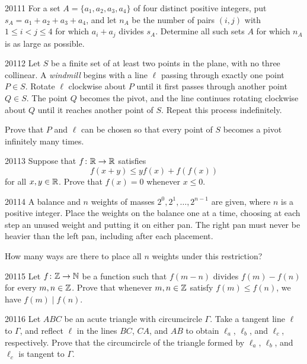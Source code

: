 
\begin{problem}{2011}{1}
For a set $A=\{a_1, a_2, a_3, a_4\}$ of four distinct positive integers, put $s_A=a_1+a_2+a_3+a_4$, and let $n_A$ be the number of pairs $(i, j)$ with $1\leq i<j\leq4$ for which $a_i+a_j$ divides $s_A$. Determine all such sets $A$ for which $n_A$ is as large as possible.
\end{problem}

\begin{problem}{2011}{2}
Let $S$ be a finite set of at least two points in the plane, with no three collinear. A \emph{windmill} begins with a line $\ell$ passing through exactly one point $P\in S$. Rotate $\ell$ clockwise about $P$ until it first passes through another point $Q\in S$. The point $Q$ becomes the pivot, and the line continues rotating clockwise about $Q$ until it reaches another point of $S$. Repeat this process indefinitely.

Prove that $P$ and $\ell$ can be chosen so that every point of $S$ becomes a pivot infinitely many times.
\end{problem}

\begin{problem}{2011}{3}
Suppose that $f\colon\mathbb{R}\to\mathbb{R}$ satisfies
\[
    f(x+y)\leq yf(x)+f(f(x))
\]
for all $x, y\in\mathbb{R}$. Prove that $f(x)=0$ whenever $x\leq0$.
\end{problem}

\begin{problem}{2011}{4}
A balance and $n$ weights of masses $2^0, 2^1, \dots, 2^{n-1}$ are given, where $n$ is a positive integer. Place the weights on the balance one at a time, choosing at each step an unused weight and putting it on either pan. The right pan must never be heavier than the left pan, including after each placement.

How many ways are there to place all $n$ weights under this restriction?
\end{problem}

\begin{problem}{2011}{5}
Let $f\colon\mathbb{Z}\to\mathbb{N}$ be a function such that $f(m-n)$ divides $f(m)-f(n)$ for every $m, n\in\mathbb{Z}$. Prove that whenever $m, n\in\mathbb{Z}$ satisfy $f(m)\leq f(n)$, we have $f(m)\mid f(n)$.
\end{problem}

\begin{problem}{2011}{6}
Let $ABC$ be an acute triangle with circumcircle $\Gamma$. Take a tangent line $\ell$ to $\Gamma$, and reflect $\ell$ in the lines $BC$, $CA$, and $AB$ to obtain $\ell_a$, $\ell_b$, and $\ell_c$, respectively. Prove that the circumcircle of the triangle formed by $\ell_a$, $\ell_b$, and $\ell_c$ is tangent to $\Gamma$.
\end{problem}
